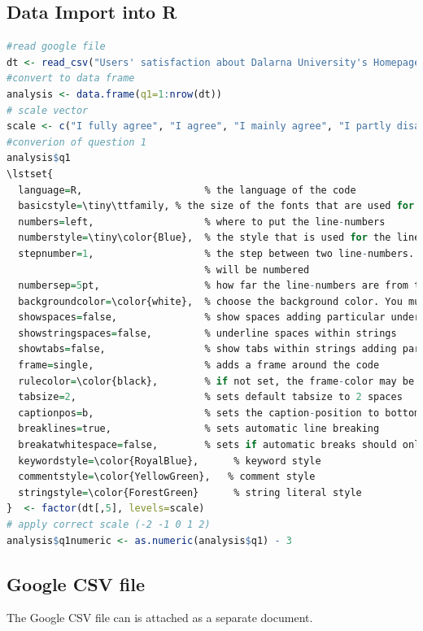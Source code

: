 \documentclass[12pt,a4paper,paper=a4,oneside,titlepage,pdftex]{scrartcl}
\begin{document}
\subsection{Data Import into R}
\begin{lstlisting}[caption={Data Import into R and first analysis steps},label={lst:r-import},language=R]
#read google file
dt <- read_csv("Users' satisfaction about Dalarna University's Homepage.csv")
#convert to data frame
analysis <- data.frame(q1=1:nrow(dt))
# scale vector
scale <- c("I fully agree", "I agree", "I mainly agree", "I partly disagree", "I disagree")
#converion of question 1
analysis$q1
\lstset{ 
  language=R,                     % the language of the code
  basicstyle=\tiny\ttfamily, % the size of the fonts that are used for the code
  numbers=left,                   % where to put the line-numbers
  numberstyle=\tiny\color{Blue},  % the style that is used for the line-numbers
  stepnumber=1,                   % the step between two line-numbers. If it is 1, each line
                                  % will be numbered
  numbersep=5pt,                  % how far the line-numbers are from the code
  backgroundcolor=\color{white},  % choose the background color. You must add \usepackage{color}
  showspaces=false,               % show spaces adding particular underscores
  showstringspaces=false,         % underline spaces within strings
  showtabs=false,                 % show tabs within strings adding particular underscores
  frame=single,                   % adds a frame around the code
  rulecolor=\color{black},        % if not set, the frame-color may be changed on line-breaks within not-black text (e.g. commens (green here))
  tabsize=2,                      % sets default tabsize to 2 spaces
  captionpos=b,                   % sets the caption-position to bottom
  breaklines=true,                % sets automatic line breaking
  breakatwhitespace=false,        % sets if automatic breaks should only happen at whitespace
  keywordstyle=\color{RoyalBlue},      % keyword style
  commentstyle=\color{YellowGreen},   % comment style
  stringstyle=\color{ForestGreen}      % string literal style
}  <- factor(dt[,5], levels=scale)
# apply correct scale (-2 -1 0 1 2)
analysis$q1numeric <- as.numeric(analysis$q1) - 3
\end{lstlisting}

\subsection{Google CSV file}
The Google CSV file can is attached as a separate document.
\end{document}
